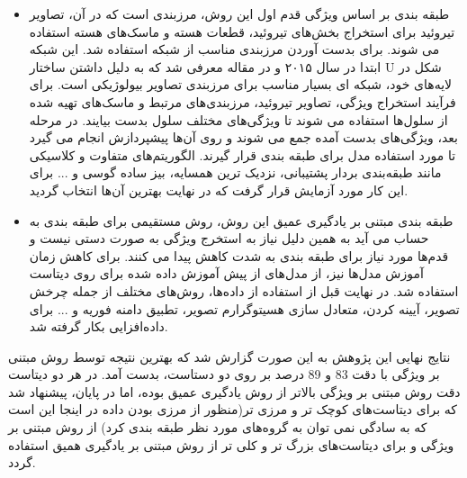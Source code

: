\begin{itemize}
    \item طبقه بندی بر اساس ویژگی\newline
    قدم اول این روش، مرزبندی است که در آن، تصاویر تیروئید برای استخراج بخش‌های تیروئید، قطعات هسته و ماسک‌های هسته استفاده می شوند. برای بدست آوردن مرزبندی مناسب از شبکه  استفاده شد. این شبکه ابتدا در سال ۲۰۱۵ و در مقاله \cite{ronneberger2015u} معرفی شد که به دلیل داشتن ساختار U شکل در لایه‌های خود، شبکه ای بسیار مناسب برای مرزبندی تصاویر بیولوژیکی است.
    برای فرآیند استخراج ویژگی، تصاویر تیروئید، مرزبندی‌های مرتبط و ماسک‌های تهیه شده از سلول‌ها استفاده می شوند تا ویژگی‌های مختلف سلول بدست بیایند.
    در مرحله بعد، ویژگی‌های بدست آمده جمع می شوند و روی آن‌ها پیشپردازش انجام می گیرد تا مورد استفاده مدل برای طبقه بندی قرار گیرند. الگوریتم‌های متفاوت و کلاسیکی مانند طبقه‌بندی بردار پشتیبانی، نزدیک ترین همسایه، بیز ساده گوسی و ... برای این کار مورد آزمایش قرار گرفت که در نهایت بهترین آن‌ها انتخاب گردید.
    \item طبقه بندی مبتنی بر یادگیری عمیق\newline
    این روش، روش مستقیمی برای طبقه بندی به حساب می آید به همین دلیل نیاز به استخرج ویژگی به صورت دستی نیست و قدم‌ها مورد نیاز برای طبقه بندی به شدت کاهش پیدا می کنند. برای کاهش زمان آموزش مدل‌ها نیز، از مدل‌های از پیش آموزش داده شده برای روی دیتاست \cite{deng2009imagenet} استفاده شد. در نهایت قبل از استفاده از داده‌ها، روش‌های مختلف از جمله چرخش تصویر، آیینه کردن، متعادل سازی هسیتوگرارم تصویر، تطبیق دامنه فوریه و ... برای داده‌افزایی بکار گرفته شد.

\end{itemize}
نتایج نهایی این پژوهش به این صورت گزارش شد که بهترین نتیجه توسط روش مبتنی بر ویژگی با دقت 83 و 89 درصد بر روی دو دستاست، بدست آمد. در هر دو دیتاست دقت روش مبتنی بر ویژگی بالاتر از روش یادگیری عمیق بوده، اما در پایان، پیشنهاد شد که برای دیتاست‌های کوچک تر و مرزی تر(منظور از مرزی بودن داده در اینجا این است که به سادگی نمی توان به گروه‌های مورد نظر طبقه بندی کرد) از روش مبتنی بر ویژگی و برای دیتاست‌های بزرگ تر و کلی تر از روش مبتنی بر یادگیری همیق استفاده گردد.